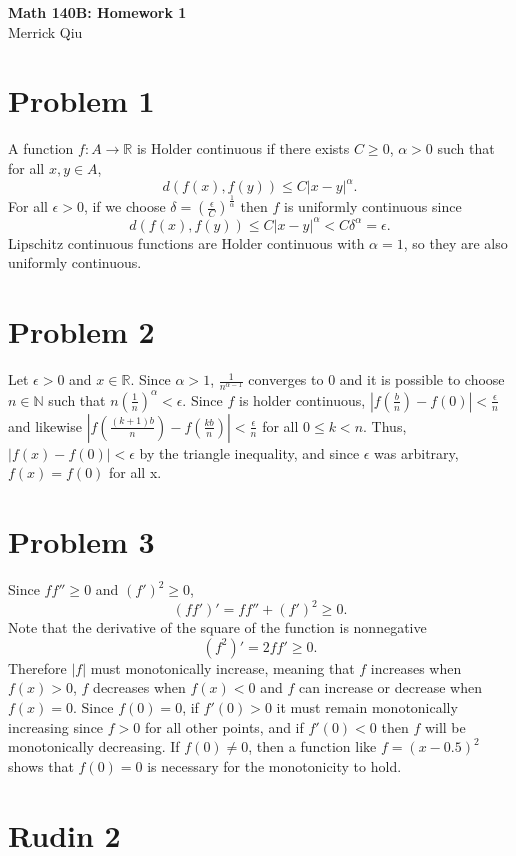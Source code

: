 \documentclass{article}
\begin{document}
\begin{center}
	\huge{\bf Math 140B: Homework 1} \\
	Merrick Qiu
\end{center}
\section*{Problem 1}
A function $f: A \to \mathbb{R}$ is Holder continuous if 
there exists $C\geq 0$, $\alpha > 0$ such that for all $x, y \in A$,
\[
	d(f(x), f(y)) \leq C|x-y|^\alpha.
\]
For all $\epsilon > 0$, if we choose $\delta = \left(\frac{\epsilon}{C}\right)^\frac{1}{\alpha}$
then $f$ is uniformly continuous since 
\[
	d(f(x), f(y)) \leq C|x-y|^\alpha < C\delta^\alpha = \epsilon.
\]
Lipschitz continuous functions are Holder continuous with $\alpha = 1$,
so they are also uniformly continuous.
\newpage 

\section*{Problem 2}
Let $\epsilon > 0$ and $x \in \mathbb{R}$.
Since $\alpha > 1$, $\frac{1}{n^{\alpha-1}}$ converges to 0 and it is possible to
choose $n \in \mathbb{N}$ such that $n\left(\frac{1}{n}\right)^\alpha < \epsilon$.
Since $f$ is holder continuous, $|f(\frac{b}{n}) - f(0)| < \frac{\epsilon}{n}$ 
and likewise $|f(\frac{(k+1)b}{n}) - f(\frac{kb}{n})| < \frac{\epsilon}{n}$
for all $ 0 \leq k < n$. 
Thus, $|f(x) - f(0)| < \epsilon$ by the triangle inequality,
and since $\epsilon$ was arbitrary, $f(x) = f(0)$ for all x.
\newpage 

\section*{Problem 3}
Since $ff'' \geq 0$ and $(f')^2 \geq 0$,
\[
	(ff')' = ff'' + (f')^2 \geq 0.
\]
Note that the derivative of the square of the function is nonnegative
\[
	(f^2)' = 2ff' \geq 0.
\]
Therefore $|f|$ must monotonically increase, meaning that $f$
increases when $f(x) > 0$, $f$ decreases
when $f(x) < 0$  and $f$ can increase or decrease when $f(x) = 0$.
Since $f(0) = 0$, if $f'(0) > 0$ it must remain monotonically increasing 
since $f > 0$ for all other points, and if $f'(0) < 0$ then $f$ will 
be monotonically decreasing.
If $f(0) \neq 0$, then a function like $f=(x-0.5)^2$ shows that 
$f(0) = 0$ is necessary for the monotonicity to hold.
\newpage 

\section*{Rudin 2}
\end{document}
